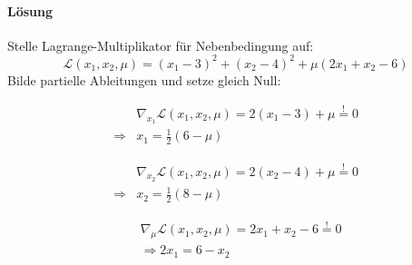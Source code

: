 \documentclass{article}
\begin{document}
\paragraph{Lösung}
Stelle Lagrange-Multiplikator für Nebenbedingung auf:
\begin{equation*}
    \mathcal{L}(x_1,x_2,\mu) = (x_1 - 3)^2 + (x_2 -4)^2 + \mu(2x_1 + x_2 - 6 )
\end{equation*}
Bilde partielle Ableitungen und setze gleich Null:

\begin{equation}\label{dx1}
\begin{aligned}
            &\nabla_{x_1}\mathcal{L}(x_1,x_2,\mu) = 2(x_1-3)+\mu \overset{!}{=} 0 \\
        \Rightarrow& x_1 = \frac{1}{2}(6-\mu)
\end{aligned}
\end{equation}

\begin{equation}\label{dx2}
\begin{aligned}
    &\nabla_{x_2}\mathcal{L}(x_1,x_2,\mu) = 2(x_2-4)+\mu \overset{!}{=} 0 \\
    \Rightarrow& x_2 = \frac{1}{2}(8-\mu)
\end{aligned}
\end{equation}

\begin{equation}\label{dmu}
\begin{aligned}
    & \nabla_{\mu}\mathcal{L}(x_1,x_2,\mu) =2x_1+x_2-6 \overset{!}{=} 0 \\
& \Rightarrow 2x_1 = 6 - x_2
\end{aligned}
\end{equation}
\end{document}
